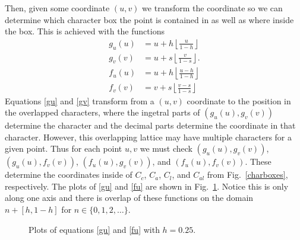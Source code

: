 \documentclass[12pt]{article}
\begin{document}
Then, given some coordinate $(u,v)$ we transform the coordinate so we can determine which character box the point is contained in as well as where inside the box. This is achieved with the functions
\begin{align}
	g_u(u) &= u + h \left\lfloor \frac{u}{1-h} \right\rfloor \label{gu} \\
	g_v(v) &= u + s \left\lfloor \frac{v}{1-s} \right\rfloor. \label{gv} \\
	f_u(u) &= u + h \left\lfloor \frac{u - h}{1-h} \right\rfloor \label{fu} \\
	f_v(v) &= v + s \left\lfloor \frac{v - s}{1-s} \right\rfloor \label{fv}
\end{align}
Equations \eqref{gu} and \eqref{gv} transform from a $(u,v)$ coordinate to the position in the overlapped characters, where the ingetral parts of $(g_u(u), g_v(v))$ determine the character and the decimal parts determine the coordinate in that character. However, this overlapping lattice may have multiple characters for a given point. Thus for each point $u,v$ we must check $(g_u(u), g_v(v))$, $(g_u(u), f_v(v))$, $(f_u(u), g_v(v))$, and $(f_u(u), f_v(v))$. These determine the coordinates inside of $C_c$, $C_a$, $C_l$, and $C_{al}$ from Fig.~\ref{charboxes}, respectively. The plots of \eqref{gu} and \eqref{fu} are shown in Fig.~\ref{transformplot}. Notice this is only along one axis and there is overlap of these functions on the domain $n + [h, 1-h]$ for $n \in \{0, 1, 2, \dots \}$.

\begin{figure}[ht]
\centering
{}
\caption{Plots of equations \eqref{gu} and \eqref{fu} with $h = 0.25$.}
\label{transformplot}
\end{figure}
\end{document}
